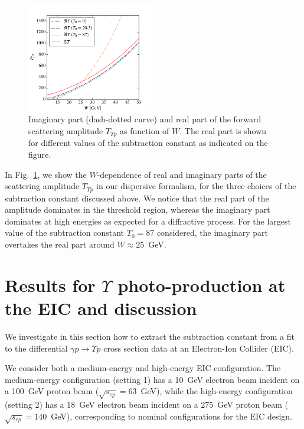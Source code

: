 \documentclass[prd,amsmath,%
twocolumn,floatfix,amssymb, preprintnumbers, linenumbers,nofootinbib, superscriptaddress]{revtex4}
\begin{document}
\begin{figure}
\includegraphics[width=0.49\textwidth]{t_y.pdf}
\caption{
Imaginary part (dash-dotted curve) and real part of the forward scattering amplitude $T_{\Upsilon p}$ as function of $W$.
The real part is shown for different values of the subtraction constant as indicated on the figure.
}
\label{fig:psip_psip}
\end{figure}


In Fig.~\ref{fig:psip_psip}, we show the $W$-dependence of real and imaginary parts of the scattering amplitude $T_{\Upsilon p}$ in our dispersive formalism, for the three choices of the subtraction constant discussed above. We notice that the real part of the amplitude dominates in the threshold region, whereas the imaginary part dominates at high energies as expected for a diffractive process. For the largest value of the subtraction constant $T_0 = 87$ considered, the imaginary part overtakes the real part around $W \approx 25$~GeV.  




\section{Results for $\Upsilon$ photo-production at the EIC and discussion}

We investigate in this section how to extract the subtraction constant from a fit to the 
 differential $\gamma p \to \Upsilon p$ cross section data at an Electron-Ion Collider (EIC). 
 
We consider both a medium-energy and high-energy EIC configuration. 
The medium-energy configuration (setting 1) has a 10~GeV electron beam incident on a 100~GeV proton beam 
($\sqrt{s_{ep}} = 63$~GeV), while the high-energy configuration (setting 2) has a 18~GeV electron beam incident 
on a 275~GeV proton beam ($\sqrt{s_{ep}} = 140$~GeV), 
corresponding to nominal configurations for the EIC design.
\end{document}

